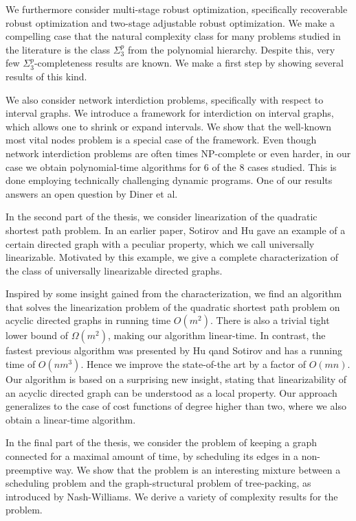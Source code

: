 \documentclass[twoside,openright,bibliography=totoc]{scrreprt}
\begin{document}
We furthermore consider multi-stage robust optimization, specifically recoverable robust optimization and two-stage adjustable robust optimization. We make a compelling case that the natural complexity class for many problems studied in the literature is the class $\Sigma^p_3$ from the polynomial hierarchy. Despite this, very few $\Sigma^p_3$-completeness results are known. We make a first step by showing several results of this kind.

We also consider network interdiction problems, specifically with respect to interval graphs. We introduce a framework for interdiction on interval graphs, which allows one to shrink or expand intervals. We show that the well-known most vital nodes problem is a special case of the framework. Even though network interdiction problems are often times NP-complete or even harder, in our case we obtain polynomial-time algorithms for 6 of the 8 cases studied. This is done employing technically challenging dynamic programs. One of our results answers an open question by Diner et al. 

In the second part of the thesis, we consider linearization of the quadratic shortest path problem. In an earlier paper, Sotirov and Hu gave an example of a certain directed graph with a peculiar property, which we call universally linearizable. Motivated by this example, we give a complete characterization of the class of universally linearizable directed graphs. 

Inspired by some insight gained from the characterization,
we find an algorithm that solves the linearization problem of the quadratic shortest path problem on acyclic directed graphs in running time $O(m^2)$. 
There is also a trivial tight lower bound of $\Omega(m^2)$, making our algorithm linear-time. 
In contrast, the fastest previous algorithm was presented by Hu qand Sotirov and has a running time of $O(nm^3)$. Hence we improve the state-of-the art by a factor of $O(mn)$. Our algorithm is based on a surprising new insight, stating that linearizability of an acyclic directed graph can be understood as a local property.  Our approach generalizes to the case of cost functions of degree higher than two, where we also obtain a linear-time algorithm.

In the final part of the thesis, we consider the problem of keeping a graph connected for a maximal amount of time, by scheduling its edges in a non-preemptive way. 
We show that the problem is an interesting mixture between a scheduling problem and the graph-structural problem of tree-packing, as introduced by Nash-Williams. We derive a variety of complexity results for the problem.
\end{document}
